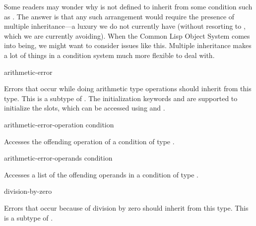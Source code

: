 \beforenoterule
\begin{sideremark}

    Some readers may wonder why  is not defined to inherit
    from some condition such as . The answer is that any such
    arrangement would require the presence of multiple inheritance---a 
    luxury we do not currently have (without resorting to , which 
    we are currently avoiding). When the Common Lisp Object System comes
    into being, we might want to consider issues like this. 
    Multiple inheritance makes a lot of things in a condition system much
    more flexible to deal with.

   
\end{sideremark}
\afternoterule

\begin{defun}[Type]
arithmetic-error

  Errors that occur while doing arithmetic type operations should inherit
  from this type. This is a subtype of . The initialization keywords 
  and  are supported to initialize the slots, which can be accessed
  using  and .
\end{defun}

\begin{defun}[Function]
arithmetic-error-operation condition

  Accesses the offending operation of a condition of type .
\end{defun}

\begin{defun}[Function]
arithmetic-error-operands condition

  Accesses a list of the offending operands in a condition of type 
  .
\end{defun}

\begin{defun}[Type]
division-by-zero

  Errors that occur because of division by zero should inherit from this type.
  This is a subtype of .
\end{defun}

